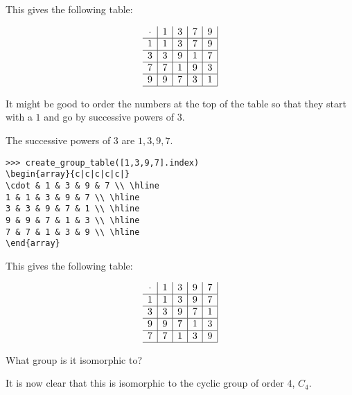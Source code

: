 \documentclass[../key.tex]{subfiles}
\begin{document}
This gives the following table:

$$\begin{array}{c|c|c|c|c|}
\cdot & 1 & 3 & 7 & 9 \\ \hline
1 & 1 & 3 & 7 & 9 \\ \hline
3 & 3 & 9 & 1 & 7 \\ \hline
7 & 7 & 1 & 9 & 3 \\ \hline
9 & 9 & 7 & 3 & 1 \\ \hline
\end{array}$$

\begin{inner_problem}
\item It might be good to order the numbers at the top of the table so that they start with a $1$ and go by successive powers of $3$.
\end{inner_problem}

The successive powers of $3$ are $1,3,9,7$.

\begin{verbatim}
>>> create_group_table([1,3,9,7].index)
\begin{array}{c|c|c|c|c|}
\cdot & 1 & 3 & 9 & 7 \\ \hline
1 & 1 & 3 & 9 & 7 \\ \hline
3 & 3 & 9 & 7 & 1 \\ \hline
9 & 9 & 7 & 1 & 3 \\ \hline
7 & 7 & 1 & 3 & 9 \\ \hline
\end{array}
\end{verbatim}

This gives the following table:

$$\begin{array}{c|c|c|c|c|}
\cdot & 1 & 3 & 9 & 7 \\ \hline
1 & 1 & 3 & 9 & 7 \\ \hline
3 & 3 & 9 & 7 & 1 \\ \hline
9 & 9 & 7 & 1 & 3 \\ \hline
7 & 7 & 1 & 3 & 9 \\ \hline
\end{array}$$

\begin{inner_problem}
\item What group is it isomorphic to?
\end{inner_problem}

It is now clear that this is isomorphic to the cyclic group of order $4$, $C_4$.
\end{document}
